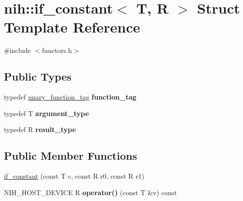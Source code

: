 \hypertarget{structnih_1_1if__constant}{
\section{nih\-:\-:if\-\_\-constant$<$ \-T, \-R $>$ \-Struct \-Template \-Reference}
\label{structnih_1_1if__constant}
}


{\ttfamily \#include $<$functors.\-h$>$}

\subsection*{\-Public \-Types}
\begin{DoxyCompactItemize}
\item 
\hypertarget{structnih_1_1if__constant_a7a289e997ad5fa2ad4c9a60613e598b8}{
typedef \hyperlink{structnih_1_1unary__function__tag}{unary\-\_\-function\-\_\-tag} {\bfseries function\-\_\-tag}}
\label{structnih_1_1if__constant_a7a289e997ad5fa2ad4c9a60613e598b8}

\item 
\hypertarget{structnih_1_1if__constant_aa64810aaea46c241f113c8d8b4f07d06}{
typedef \-T {\bfseries argument\-\_\-type}}
\label{structnih_1_1if__constant_aa64810aaea46c241f113c8d8b4f07d06}

\item 
\hypertarget{structnih_1_1if__constant_a159dc8e54ab9afe79b774dd9a350834d}{
typedef \-R {\bfseries result\-\_\-type}}
\label{structnih_1_1if__constant_a159dc8e54ab9afe79b774dd9a350834d}

\end{DoxyCompactItemize}
\subsection*{\-Public \-Member \-Functions}
\begin{DoxyCompactItemize}
\item 
\hyperlink{structnih_1_1if__constant_a77290aa02588bf6d74f7aa705111df83}{if\-\_\-constant} (const \-T c, const \-R r0, const \-R r1)
\item 
\hypertarget{structnih_1_1if__constant_adefcc7f8a693206e01e0af6a826c47a2}{
\-N\-I\-H\-\_\-\-H\-O\-S\-T\-\_\-\-D\-E\-V\-I\-C\-E \-R {\bfseries operator()} (const \-T \&v) const }
\label{structnih_1_1if__constant_adefcc7f8a693206e01e0af6a826c47a2}

\end{DoxyCompactItemize}


